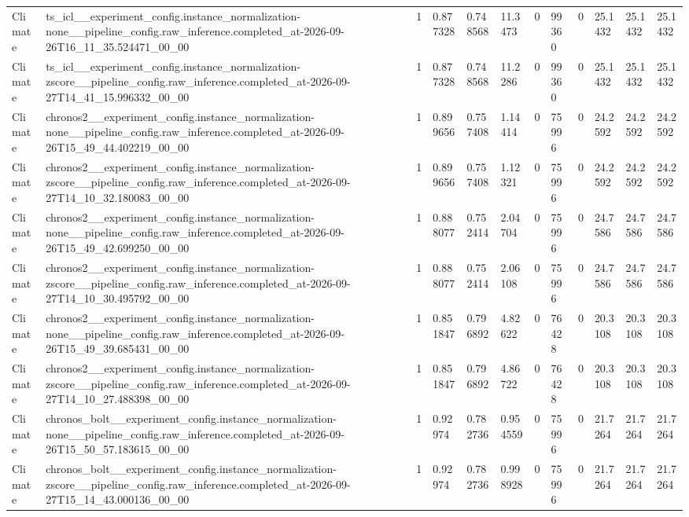 \begin{tabular}{llllllllllll}
Climate & ts\_icl\_\_experiment\_config.instance\_normalization-none\_\_pipeline\_config.raw\_inference.completed\_at-2026-09-26T16\_11\_35.524471\_00\_00 & 1 & 0.877328 & 0.748568 & 11.3473 & 0 & 99360 & 0 & 25.1432 & 25.1432 & 25.1432 \\
Climate & ts\_icl\_\_experiment\_config.instance\_normalization-zscore\_\_pipeline\_config.raw\_inference.completed\_at-2026-09-27T14\_41\_15.996332\_00\_00 & 1 & 0.877328 & 0.748568 & 11.2286 & 0 & 99360 & 0 & 25.1432 & 25.1432 & 25.1432 \\
Climate & chronos2\_\_experiment\_config.instance\_normalization-none\_\_pipeline\_config.raw\_inference.completed\_at-2026-09-26T15\_49\_44.402219\_00\_00 & 1 & 0.899656 & 0.757408 & 1.14414 & 0 & 75996 & 0 & 24.2592 & 24.2592 & 24.2592 \\
Climate & chronos2\_\_experiment\_config.instance\_normalization-zscore\_\_pipeline\_config.raw\_inference.completed\_at-2026-09-27T14\_10\_32.180083\_00\_00 & 1 & 0.899656 & 0.757408 & 1.12321 & 0 & 75996 & 0 & 24.2592 & 24.2592 & 24.2592 \\
Climate & chronos2\_\_experiment\_config.instance\_normalization-none\_\_pipeline\_config.raw\_inference.completed\_at-2026-09-26T15\_49\_42.699250\_00\_00 & 1 & 0.888077 & 0.752414 & 2.04704 & 0 & 75996 & 0 & 24.7586 & 24.7586 & 24.7586 \\
Climate & chronos2\_\_experiment\_config.instance\_normalization-zscore\_\_pipeline\_config.raw\_inference.completed\_at-2026-09-27T14\_10\_30.495792\_00\_00 & 1 & 0.888077 & 0.752414 & 2.06108 & 0 & 75996 & 0 & 24.7586 & 24.7586 & 24.7586 \\
Climate & chronos2\_\_experiment\_config.instance\_normalization-none\_\_pipeline\_config.raw\_inference.completed\_at-2026-09-26T15\_49\_39.685431\_00\_00 & 1 & 0.851847 & 0.796892 & 4.82622 & 0 & 76428 & 0 & 20.3108 & 20.3108 & 20.3108 \\
Climate & chronos2\_\_experiment\_config.instance\_normalization-zscore\_\_pipeline\_config.raw\_inference.completed\_at-2026-09-27T14\_10\_27.488398\_00\_00 & 1 & 0.851847 & 0.796892 & 4.86722 & 0 & 76428 & 0 & 20.3108 & 20.3108 & 20.3108 \\
Climate & chronos\_bolt\_\_experiment\_config.instance\_normalization-none\_\_pipeline\_config.raw\_inference.completed\_at-2026-09-26T15\_50\_57.183615\_00\_00 & 1 & 0.92974 & 0.782736 & 0.954559 & 0 & 75996 & 0 & 21.7264 & 21.7264 & 21.7264 \\
Climate & chronos\_bolt\_\_experiment\_config.instance\_normalization-zscore\_\_pipeline\_config.raw\_inference.completed\_at-2026-09-27T15\_14\_43.000136\_00\_00 & 1 & 0.92974 & 0.782736 & 0.998928 & 0 & 75996 & 0 & 21.7264 & 21.7264 & 21.7264 \\

\end{tabular}
